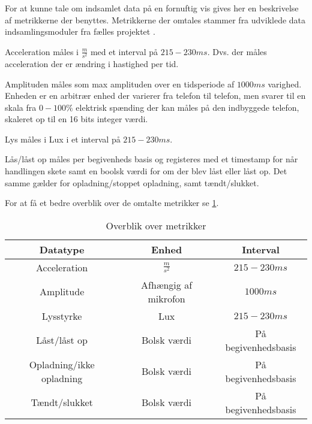 For at kunne tale om indsamlet data på en fornuftig vis gives her en beskrivelse af metrikkerne der benyttes.
Metrikkerne der omtales stammer fra udviklede data indsamlingsmoduler fra fælles projektet \citep{misc:faellesrapp}.

Acceleration måles i $\frac{m}{s^2}$ med et interval på $215-230 ms$.
Dvs. der måles acceleration der er ændring i hastighed per tid.

Amplituden måles som max amplituden over en tidsperiode af $1000ms$ varighed.
Enheden er en arbitrær enhed der varierer fra telefon til telefon, men svarer til en skala fra $0-100\%$ elektrisk spænding der kan måles på den indbyggede telefon, skaleret op til en 16 bits integer værdi.

Lys måles i Lux i et interval på $215-230 ms$.

Lås/låst op måles per begivenheds basis og registeres med et timestamp for når handlingen skete samt en boolsk værdi for om der blev låst eller låst op.
Det samme gælder for opladning/stoppet opladning, samt tændt/slukket.

For at få et bedre overblik over de omtalte metrikker se \cref{tab:metrikker}.

\begin{table}[h]
\begin{tabular}{|c|c|c|}
	\hline Datatype & Enhed & Interval \\ 
	\hline Acceleration & $\frac{m}{s^2}$ & $215-230ms$ \\ 
	\hline Amplitude & Afhængig af mikrofon & $1000ms$ \\ 
	\hline Lysstyrke & Lux & $215-230ms$ \\ 
	\hline Låst/låst op & Bolsk værdi & På begivenhedsbasis \\ 
	\hline Opladning/ikke opladning & Bolsk værdi & På begivenhedsbasis \\ 
	\hline Tændt/slukket & Bolsk værdi & På begivenhedsbasis \\ 
	\hline 
\end{tabular}
\caption{Overblik over metrikker}\label{tab:metrikker} 
\end{table}